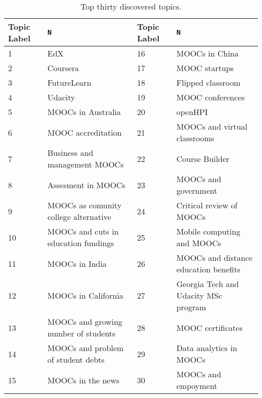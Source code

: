 \begin{table}[!b]
\centering
\caption{Top thirty discovered topics.} 
\label{tab:topics}
{\footnotesize
\begin{tabularx}{\textwidth}{X>{\raggedleft\arraybackslash}p{0.8cm}X>{\raggedleft\arraybackslash}p{0.8cm}}
  \toprule
Topic Label & \texttt{N} & Topic Label & \texttt{N} \\ 
  \midrule
  1 & EdX &  16 & MOOCs in China \\ 
    2 & Coursera &  17 & MOOC startups \\ 
    3 & FutureLearn &  18 & Flipped classroom \\ 
    4 & Udacity &  19 & MOOC conferences \\ 
    5 & MOOCs in Australia &  20 & openHPI \\ 
    6 & MOOC accreditation &  21 & MOOCs and virtual classrooms \\ 
    7 & Business and management MOOCs &  22 & Course Builder \\ 
    8 & Assesment in MOOCs &  23 & MOOCs and government \\ 
    9 & MOOCs as comunity college alternative &  24 & Critical review of MOOCs \\ 
   10 & MOOCs and cuts in education fundings &  25 & Mobile computing and MOOCs \\ 
   11 & MOOCs in India &  26 & MOOCs and distance education benefits \\ 
   12 & MOOCs in California &  27 & Georgia Tech and Udacity MSc program \\ 
   13 & MOOCs and growing number of students &  28 & MOOC certificates \\ 
   14 & MOOCs and problem of student debts &  29 & Data analytics in MOOCs \\ 
   15 & MOOCs in the news &  30 & MOOCs and empoyment \\ 
   \bottomrule
\end{tabularx}
}
\end{table}
